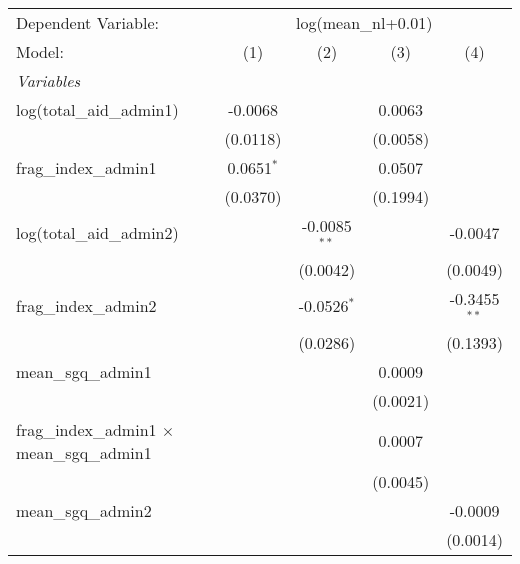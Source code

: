 



\begingroup
\centering
\begin{tabular}{lcccc}
   \tabularnewline \midrule \midrule
   Dependent Variable: & \multicolumn{4}{c}{log(mean\_nl+0.01)}\\
   Model:                                              & (1)          & (2)            & (3)      & (4)\\  
   \midrule
   \emph{Variables}\\
   log(total\_aid\_admin1)                             & -0.0068      &                & 0.0063   &   \\   
                                                       & (0.0118)     &                & (0.0058) &   \\   
   frag\_index\_admin1                                 & 0.0651$^{*}$ &                & 0.0507   &   \\   
                                                       & (0.0370)     &                & (0.1994) &   \\   
   log(total\_aid\_admin2)                             &              & -0.0085$^{**}$ &          & -0.0047\\   
                                                       &              & (0.0042)       &          & (0.0049)\\   
   frag\_index\_admin2                                 &              & -0.0526$^{*}$  &          & -0.3455$^{**}$\\   
                                                       &              & (0.0286)       &          & (0.1393)\\   
   mean\_sgq\_admin1                                   &              &                & 0.0009   &   \\   
                                                       &              &                & (0.0021) &   \\   
   frag\_index\_admin1 $\times$ mean\_sgq\_admin1      &              &                & 0.0007   &   \\   
                                                       &              &                & (0.0045) &   \\   
   mean\_sgq\_admin2                                   &              &                &          & -0.0009\\   
                                                       &              &                &          & (0.0014)\\   

\end{tabular}
